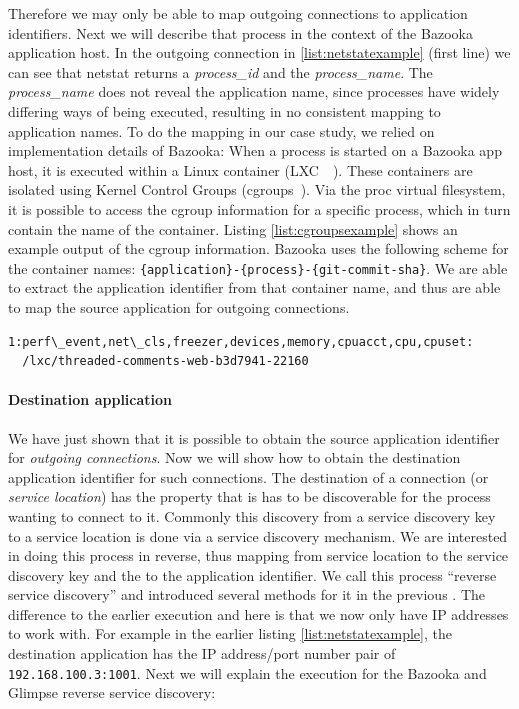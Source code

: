 Therefore we may only be able to map outgoing connections to application identifiers. Next we will describe that process in the context of the Bazooka application host. In the outgoing connection in \autoref{list:netstatexample} (first line) we can see that netstat returns a \emph{process\_id} and the \emph{process\_name}. The \emph{process\_name} does not reveal the application name, since processes have widely differing ways of being executed, resulting in no consistent mapping to application names. To do the mapping in our case study, we relied on implementation details of Bazooka: When a process is started on a Bazooka app host, it is executed within a Linux container (LXC~\cite{lxc}~\cite{lxcsuse}). These containers are isolated using Kernel Control Groups (cgroups~\cite{cgroups}). Via the proc virtual filesystem, it is possible to access the cgroup information for a specific process, which in turn contain the name of the container. Listing \ref{list:cgroupsexample} shows an example output of the cgroup information. Bazooka uses the following scheme for the container names: \newline \lstinline!{application}-{process}-{git-commit-sha}!. \newline We are able to extract the application identifier from that container name, and thus are able to map the source application for outgoing connections.

\begin{lstlisting}[caption=Cgroup information example from the proc virtual filesystem\, retrieved via \lstinline{cat /proc/20471/cgroup} in our case study,label=list:cgroupsexample]
1:perf\_event,net\_cls,freezer,devices,memory,cpuacct,cpu,cpuset:
  /lxc/threaded-comments-web-b3d7941-22160
\end{lstlisting}

\paragraph{Destination application} We have just shown that it is possible to obtain the source application identifier for \emph{outgoing connections}. Now we will show how to obtain the destination application identifier for such connections. The destination of a connection (or \emph{service location}) has the property that is has to be discoverable for the process wanting to connect to it. Commonly this discovery from a service discovery key to a service location is done via a service discovery mechanism. We are interested in doing this process in reverse, thus mapping from service location to the service discovery key and the to the application identifier. We call this process ``reverse service discovery'' and introduced several methods for it in the previous . The difference to the earlier execution and here is that we now only have IP addresses to work with. For example in the earlier listing \autoref{list:netstatexample}, the destination application has the IP address/port number pair of \lstinline{192.168.100.3:1001}. Next we will explain the execution for the Bazooka and Glimpse reverse service discovery:

